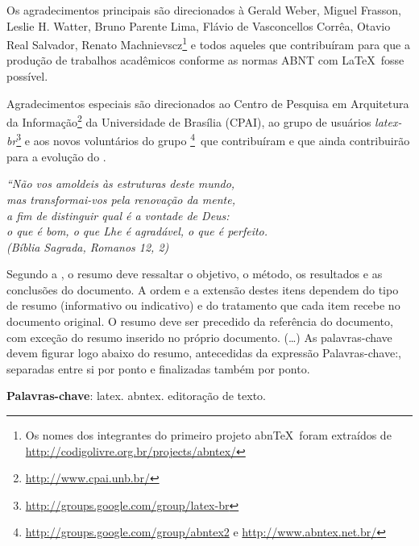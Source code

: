 \documentclass[
	12pt,				%
	openright,			%
	twoside,			%
	a4paper,			%
	english,			%
	french,				%
	spanish,			%
	brazil				%
	]{abntex2}
\begin{document}
\begin{agradecimentos}
Os agradecimentos principais são direcionados à Gerald Weber, Miguel Frasson,
Leslie H. Watter, Bruno Parente Lima, Flávio de Vasconcellos Corrêa, Otavio Real
Salvador, Renato Machnievscz\footnote{Os nomes dos integrantes do primeiro
projeto abn\TeX\ foram extraídos de
\url{http://codigolivre.org.br/projects/abntex/}} e todos aqueles que
contribuíram para que a produção de trabalhos acadêmicos conforme
as normas ABNT com \LaTeX\ fosse possível.

Agradecimentos especiais são direcionados ao Centro de Pesquisa em Arquitetura
da Informação\footnote{\url{http://www.cpai.unb.br/}} da Universidade de
Brasília (CPAI), ao grupo de usuários
\emph{latex-br}\footnote{\url{http://groups.google.com/group/latex-br}} e aos
novos voluntários do grupo
\emph{\abnTeX}\footnote{\url{http://groups.google.com/group/abntex2} e
\url{http://www.abntex.net.br/}}~que contribuíram e que ainda
contribuirão para a evolução do \abnTeX.

\end{agradecimentos}

\begin{epigrafe}
    \vspace*{\fill}
	\begin{flushright}
		\textit{``Não vos amoldeis às estruturas deste mundo, \\
		mas transformai-vos pela renovação da mente, \\
		a fim de distinguir qual é a vontade de Deus: \\
		o que é bom, o que Lhe é agradável, o que é perfeito.\\
		(Bíblia Sagrada, Romanos 12, 2)}
	\end{flushright}
\end{epigrafe}


\setlength{\absparsep}{18pt} %
\begin{resumo}
 Segundo a , o resumo deve ressaltar o
 objetivo, o método, os resultados e as conclusões do documento. A ordem e a extensão
 destes itens dependem do tipo de resumo (informativo ou indicativo) e do
 tratamento que cada item recebe no documento original. O resumo deve ser
 precedido da referência do documento, com exceção do resumo inserido no
 próprio documento. (\ldots) As palavras-chave devem figurar logo abaixo do
 resumo, antecedidas da expressão Palavras-chave:, separadas entre si por
 ponto e finalizadas também por ponto.

 \textbf{Palavras-chave}: latex. abntex. editoração de texto.
\end{resumo}
\end{document}
